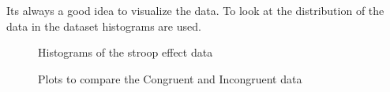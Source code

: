 \documentclass[12pt]{article}%
\begin{document}
Its always a good idea to visualize the data. To look at the distribution of the data in the dataset histograms are used.
 \begin{figure}[h]
     \centering
     \qquad
     \caption{Histograms of the stroop effect data}%
     \label{fig:example}%
 \end{figure}

 \begin{figure}[h]
     \centering
     \qquad
     \caption{Plots to compare the Congruent and Incongruent data}%
     \label{fig:example}%
 \end{figure}
 
\end{document}
